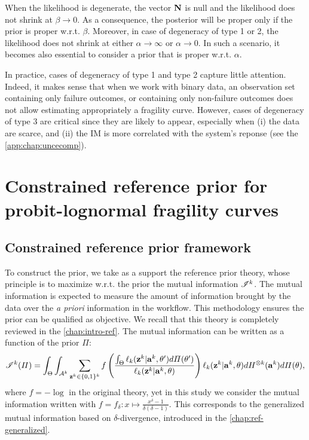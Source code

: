 When the likelihood is degenerate, the vector $\mathbf{N}$ is null and the likelihood does not shrink at $\beta\to0$.
As a consequence, the posterior will be proper only if the prior is proper w.r.t. $\beta$.
Moreover, in case of degeneracy of type 1 or 2, the likelihood does not shrink at either $\alpha\to\infty$ or $\alpha\to0$. In such a scenario, it becomes also essential to consider a prior that is proper  w.r.t. $\alpha$.

In practice, cases of degeneracy of type 1 and type 2 capture little attention. 
Indeed, it makes sense that when we work with binary data, an observation set containing only failure outcomes, or containing only non-failure outcomes does not allow estimating appropriately a fragility curve.
However, cases of degeneracy of type 3 are critical since they are likely to appear, especially when (i) the data are scarce, and (ii) the IM is more correlated with the system's reponse (see the \cref{app:chap:uncecomp}).


\section{Constrained reference prior for probit-lognormal fragility curves}\label{sec:constr-frags:constrained}


\subsection{Constrained reference prior framework}\label{sec:constr-frags:subsec-constr-frame}



To construct the prior, we take as a support the reference prior theory, whose principle is to maximize w.r.t. the prior the mutual information $\mathscr{I}^k$. The mutual information is expected to measure the amount of information brought by the data over the \emph{a priori} information in the workflow. This methodology ensures the prior can be qualified as objective. We recall that this theory is completely reviewed in the \cref{chap:intro-ref}.
The mutual information can be written as a function of the prior $\varPi$:
\begin{equation}\label{eq:constr-frag:MI}
    \mathscr{I}^k(\varPi) = \int_{\Theta}\int_{\mathcal{A}^k}\sum_{\mathbf{z}^k\in\{0,1\}^k}f\left(\frac{\int_\Theta\ell_k(\mathbf{z}^k|\mathbf{a}^k,\theta')d\varPi(\theta')  }{\ell_k(\mathbf{z}^k|\mathbf{a}^k,\theta)}\right)\ell_k(\mathbf{z}^k|\mathbf{a}^k,\theta)dH^{\otimes k}(\mathbf{a}^k)d\varPi(\theta)  ,    
\end{equation}
where $f=-\log$ in the original theory, yet in this study we consider the mutual information written with $f=f_\delta:x\mapsto\frac{x^\delta-1}{\delta(\delta-1)}$.
This corresponds to the generalized mutual information 
based on $\delta$-divergence, introduced in the \cref{chap:ref-generalized}. 

